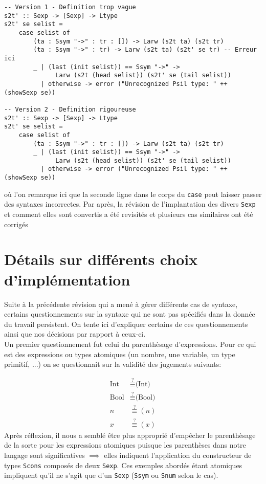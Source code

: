 \documentclass[11pt, titlepage]{article}
\begin{document}
\begin{lstlisting}
-- Version 1 - Definition trop vague
s2t' :: Sexp -> [Sexp] -> Ltype
s2t' se selist =
    case selist of
        (ta : Ssym "->" : tr : []) -> Larw (s2t ta) (s2t tr)
        (ta : Ssym "->" : tr) -> Larw (s2t ta) (s2t' se tr) -- Erreur ici
        _ | (last (init selist)) == Ssym "->" ->
              Larw (s2t (head selist)) (s2t' se (tail selist))
          | otherwise -> error ("Unrecognized Psil type: " ++ (showSexp se))

-- Version 2 - Definition rigoureuse
s2t' :: Sexp -> [Sexp] -> Ltype
s2t' se selist =
    case selist of
        (ta : Ssym "->" : tr : []) -> Larw (s2t ta) (s2t tr)
        _ | (last (init selist)) == Ssym "->" ->
              Larw (s2t (head selist)) (s2t' se (tail selist))
          | otherwise -> error ("Unrecognized Psil type: " ++ (showSexp se))
\end{lstlisting}
où l'on remarque ici que la seconde ligne dans le corps du \texttt{case} peut
laisser passer des syntaxes incorrectes. Par après, la révision de
l'implantation des divers \texttt{Sexp} et comment elles sont convertis a été
revisités et plusieurs cas similaires ont été corrigés

\section{Détails sur différents choix d'implémentation}

Suite à la précédente révision qui a mené à gérer différents cas de syntaxe,
certains questionnements sur la syntaxe qui ne sont pas spécifiés dans la
donnée du travail persistent. On tente ici d'expliquer certains de ces
questionnements ainsi que nos décisions par rapport à ceux-ci. \\

Un premier questionnement fut celui du parenthèsage d'expressions. Pour ce qui
est des expressions ou types atomiques (un nombre, une variable, un type
primitif, ...) on se questionnait sur la validité des jugements suivants:

\begin{align}
    \text{Int} & \stackrel{?}{\equiv} \text{(Int)} \tag{Type nombres entiers} \\
    \text{Bool} & \stackrel{?}{\equiv} \text{(Bool)} \tag{Type booléens} \\
    n & \stackrel{?}{\equiv} (n) \tag{Un entier} \\
    x & \stackrel{?}{\equiv} (x) \tag{Une variable}
\end{align}
Après réflexion, il nous a semblé être plus approprié d'empêcher le
parenthèsage de la sorte pour les expressions atomiques puisque les parenthèses
dans notre langage sont significatives \(\implies\) elles indiquent
l'application du constructeur de types \texttt{Scons} composés de deux 
\texttt{Sexp}. Ces exemples abordés étant atomiques impliquent qu'il ne s'agit 
que d'un  \texttt{Sexp} (\texttt{Ssym} ou \texttt{Snum} selon le cas). \\
\end{document}
